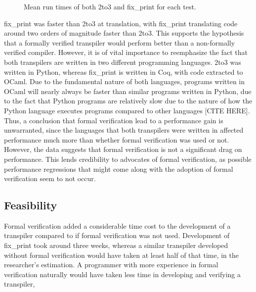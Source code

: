 \begin{figure*}[ht]
    \caption{Mean run times of both 2to3 and fix_print for each test.}
\end{figure*}


fix\_print was faster than 2to3 at translation, with fix\_print translating code around two orders of magnitude faster than 2to3. This supports the hypothesis that a formally verified transpiler would perform better than a non-formally verified compiler. However, it is of vital importance to reemphasize the fact that both transpilers are written in two different programming languages. 2to3 was written in Python, whereas fix\_print is written in Coq, with code extracted to OCaml. Due to the fundamental nature of both languages, programs written in OCaml will nearly always be faster than similar programs written in Python, due to the fact that Python programs are relatively slow due to the nature of how the Python language executes programs compared to other languages [CITE HERE]. Thus, a conclusion that formal verification lead to a performance gain is unwarranted, since the languages that both transpilers were written in affected performance much more than whether formal verification was used or not. However, the data suggests that formal verification is not a significant drag on performance. This lends credibility to advocates of formal verification, as possible performance regressions that might come along with the adoption of formal verification seem to not occur.

\subsection{Feasibility}
Formal verification added a considerable time cost to the development of a transpiler compared to if formal verification was not used. Development of fix\_print took around three weeks, whereas a similar transpiler developed without formal verification would have taken at least half of that time, in the researcher's estimation. A programmer with more experience in formal verification naturally would have taken less time in developing and verifying a transpiler, 